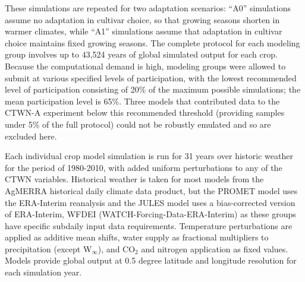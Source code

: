 \documentclass[gmd, manuscript]{copernicus} %
\begin{document}
These simulations are repeated for two adaptation scenarios: ``A0'' simulations assume no adaptation in cultivar choice, so that growing seasons shorten in warmer climates, while ``A1'' simulations assume that adaptation in cultivar choice maintains fixed growing seasons. 
The complete protocol for each modeling group involves up to 43,524 years %
of global simulated output for each crop.
Because the computational demand is high, modeling groups were allowed to submit at various specified levels of participation, with the lowest recommended level of participation consisting of 20\% of the maximum possible simulations; the mean participation level is 65\%. 
Three models that contributed data to the CTWN-A experiment \citep{franke2019ctwnexperiment} below this recommended threshold (providing samples under 5\% of the full protocol) could not be robustly emulated and so are excluded here.


Each individual crop model simulation is run for 31 years over historic weather for the period of 1980-2010, with added uniform perturbations to any of the CTWN variables.
Historical weather is taken for most models from the AgMERRA \citep{Ruane2015} historical daily climate data product, but the PROMET model uses the ERA-Interim reanalysis \citep{dee2011era} and the JULES model uses a bias-corrected version of ERA-Interim, WFDEI (WATCH-Forcing-Data-ERA-Interim) \citep{weedon2014wfdei} as these groups have specific subdaily input data requirements. 
Temperature perturbations are applied as additive mean shifts, water supply as fractional multipliers to precipitation (except W$_{\infty}$), and CO$_2$ and nitrogen application as fixed values. 
Models provide global output at 0.5 degree latitude and longitude resolution for each simulation year.

\end{document}

